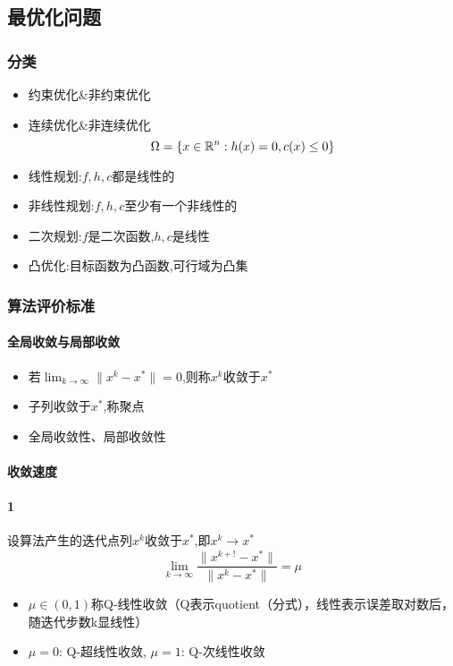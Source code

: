 \documentclass{mytemplate}
\begin{document}
\subsection{最优化问题}
\subsubsection{分类}
\begin{itemize}
    \item 约束优化\&非约束优化
    \item 连续优化\&非连续优化
          \[
              \Omega = \{ x \in \mathbb{R}^n: h(x) =0, c(x) \leq 0 \}
          \]
    \item 线性规划:$f,h,c$都是线性的
    \item 非线性规划:$f,h,c$至少有一个非线性的
    \item 二次规划:$f$是二次函数,$h,c$是线性
    \item 凸优化:目标函数为凸函数,可行域为凸集
\end{itemize}

\subsubsection{算法评价标准}
\paragraph*{全局收敛与局部收敛}
\begin{itemize}
    \item 若$\lim_{k \rightarrow \infty} \|x^k - x^*\| = 0$,则称${x^k}$收敛于$x^*$
    \item 子列收敛于$x^*$,称聚点
    \item 全局收敛性、局部收敛性
\end{itemize}

\paragraph*{收敛速度}
\paragraph{1} 设算法产生的迭代点列${x^k}$收敛于$x^*$,即$x^k \rightarrow x^*$ \\
\[
    \lim_{k \rightarrow \infty} \frac{\|x^{k+!} - x^*\|}{\|x^{k} - x^*\|} = \mu
\]
\begin{itemize}
    \item $\mu \in (0, 1)$称Q-线性收敛（Q表示quotient（分式），线性表示误差取对数后，随迭代步数k显线性）
    \item $\mu = 0$:  Q-超线性收敛,  $\mu = 1$:  Q-次线性收敛
\end{itemize}
\end{document}
